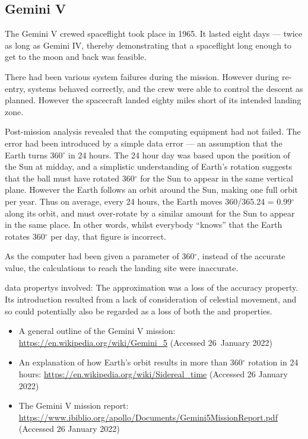 \subsection{Gemini V}\label{bkm:incacc:geminiV}
The Gemini V crewed spaceflight took place in 1965. It lasted eight days --- twice as long as Gemini IV, thereby demonstrating that a spaceflight long enough to get to the moon and back was feasible.

There had been various system failures during the mission. However during re-entry, systems behaved correctly, and the crew were able to control the descent as planned. However the spacecraft landed eighty miles short of its intended landing zone.

Post-mission analysis revealed that the computing equipment had not failed. The error had been introduced by a simple \gls{data error} ---
an assumption that the Earth turns 360$^\circ$ in 24 hours. The 24 hour day was based upon the position of the Sun at midday,
and a simplistic understanding of Earth's rotation suggests that the ball must have rotated 360$^\circ$ for the Sun to appear in the same vertical plane. However the Earth follows an orbit around the Sun, making one full orbit per year.
Thus on average, every 24 hours, the Earth moves 360/365.24 = 0.99$^\circ$ along its orbit,
and must over-rotate by a similar amount for the Sun to appear in the same place.
In other words, whilst everybody ``knows'' that the Earth rotates 360$^\circ$ per day, that figure is incorrect.

As the computer had been given a parameter of 360$^\circ$, instead of the accurate value, the calculations to reach the landing site were inaccurate.

\Glspl{data property} involved: The approximation was a loss of the \gls{accuracy} property.
Its introduction resulted from a lack of consideration of celestial movement,
and so could potentially also be regarded as a loss of both the  and  properties.

\begin{itemize}
\item A general outline of the Gemini V mission:
  \href{https://en.wikipedia.org/wiki/Gemini\_5}
       {https://en.wikipedia.org/wiki/Gemini\_5}
       (Accessed 26~January 2022)
     \item An explanation of how Earth's orbit results in more than 360$^\circ$ rotation in 24 hours: 
       \href{https://en.wikipedia.org/wiki/Sidereal\_time}
            {https://en.wikipedia.org/wiki/Sidereal\_time}
       (Accessed 26 January 2022)
          \item The Gemini V mission report:
            \href{https://www.ibiblio.org/apollo/Documents/Gemini5MissionReport.pdf}
                 {https://www.ibiblio.org/apollo/Documents/Gemini5MissionReport.pdf}
       (Accessed 26 January 2022)
\end{itemize}

